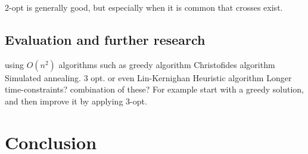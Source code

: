 \documentclass{article}
\begin{document}
2-opt is generally good, but especially when it is common that crosses exist.


\subsection{Evaluation and further research}\label{subsec3}
using $O(n^2)$ algorithms such as 
greedy algorithm
Christofides algorithm
Simulated annealing.
3 opt. or even Lin-Kernighan Heuristic algorithm
Longer time-constraints?
combination of these? For example start with a greedy solution, and then improve it by applying 3-opt.

\section{Conclusion}\label{sec5}






\newpage

 \label{sec6}
\end{document}
